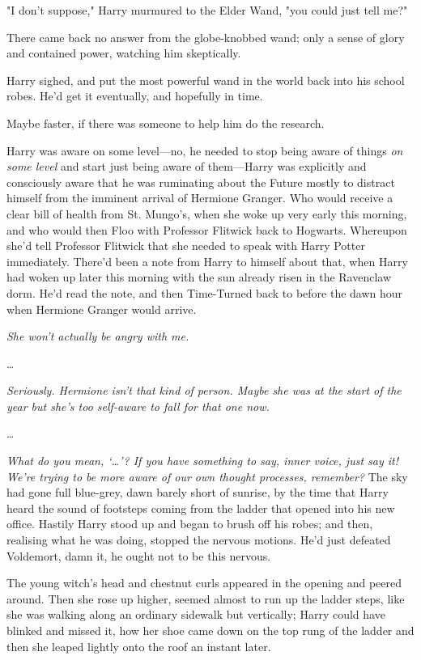 "I don't suppose," Harry murmured to the Elder Wand, "you could just tell me?"

There came back no answer from the globe-knobbed wand; only a sense of glory
and contained power, watching him skeptically.

Harry sighed, and put the most powerful wand in the world back into his school
robes. He'd get it eventually, and hopefully in time.

Maybe faster, if there was someone to help him do the research.

Harry was aware on some level---no, he needed to stop being aware of things
\emph{on some level} and start just being aware of them---Harry was explicitly
and consciously aware that he was ruminating about the Future mostly to
distract himself from the imminent arrival of Hermione Granger. Who would
receive a clear bill of health from St. Mungo's, when she woke up very early
this morning, and who would then Floo with Professor Flitwick back to Hogwarts.
Whereupon she'd tell Professor Flitwick that she needed to speak with Harry
Potter immediately. There'd been a note from Harry to himself about that, when
Harry had woken up later this morning with the sun already risen in the
Ravenclaw dorm. He'd read the note, and then Time-Turned back to before the
dawn hour when Hermione Granger would arrive.

\emph{She won't actually be angry with me.}

{\ldots}

\emph{Seriously. Hermione isn't that kind of person. Maybe she was at the start
of the year but she's too self-aware to fall for that one now.}

{\ldots}

\emph{What do you mean, `{\ldots}'? If you have something to say, inner voice,
just say it! We're trying to be more aware of our own thought processes,
remember?}
\later
The sky had gone full blue-grey, dawn barely short of sunrise, by the time that
Harry heard the sound of footsteps coming from the ladder that opened into his
new office. Hastily Harry stood up and began to brush off his robes; and then,
realising what he was doing, stopped the nervous motions. He'd just defeated
Voldemort, damn it, he ought not to be this nervous.

The young witch's head and chestnut curls appeared in the opening and peered
around. Then she rose up higher, seemed almost to run up the ladder steps, like
she was walking along an ordinary sidewalk but vertically; Harry could have
blinked and missed it, how her shoe came down on the top rung of the ladder
and then she leaped lightly onto the roof an instant later.

